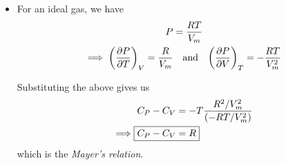 			\begin{itemize}
				\item For an ideal gas, we have
				\begin{align*}
					P&=\dfrac{RT}{V_m} \\
					\implies \qty(\pdv{P}{T})_V=\dfrac{R}{V_m}&\qq{and}\qty(\pdv{P}{V})_T=-\dfrac{RT}{V_m^2}
				\end{align*}
				
				Substituting the above gives us
				\begin{align*}
					C_P-C_V&=-T\dfrac{R^2/V_m^2}{\qty(-RT/V_m^2)} \\
					\implies\Aboxed{C_P-C_V&=R}
				\end{align*}
				which is the \textit{Mayer's relation}.
			\end{itemize}